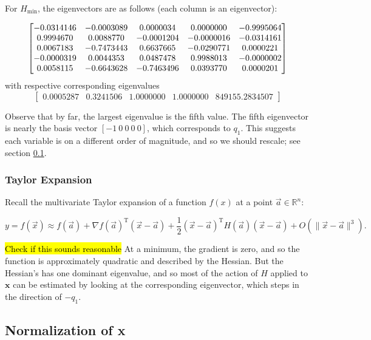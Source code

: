\documentclass[sn-mathphys,Numbered]{sn-jnl}%
\theoremstyle{thmstyleone}%
\theoremstyle{thmstyletwo}%
\theoremstyle{thmstylethree}%
\begin{document}
For $H_{\min}$, the eigenvectors are as follows (each column is an eigenvector):

\[
  \begin{bmatrix}
	-0.0314146 & -0.0003089 &  0.0000034 &  0.0000000 & -0.9995064 \cr
	0.9994670 &  0.0088770 & -0.0001204 & -0.0000016 & -0.0314161 \cr
	0.0067183 & -0.7473443 &  0.6637665 & -0.0290771 &  0.0000221 \cr
	-0.0000319 &  0.0044353 &  0.0487478 &  0.9988013 & -0.0000002 \cr
	0.0058115 & -0.6643628 & -0.7463496 &  0.0393770 &  0.0000201
\end{bmatrix}
\]
with respective corresponding eigenvalues 
\[
  \begin{bmatrix}
	0.0005287 &  0.3241506 &  1.0000000 &  1.0000000 & 849155.2834507
\end{bmatrix}
\]

Observe that by far, the largest eigenvalue is the fifth value.  The fifth eigenvector is nearly the basis vector $[-1 ~0~ 0~ 0~ 0]$, which corresponds to $q_1$.  This suggests each variable is on a different order of magnitude, and so we should rescale; see section \ref{subsec:normalization}.

\subsubsection{Taylor Expansion}


Recall the multivariate Taylor expansion of a function $f(x)$ at a point $\vec{a}\in\mathbb{R}^n$:
%

$$ y = f(\vec{x})\approx f(\vec{a}) + \nabla f(\vec{a})^\mathrm{T} (\vec{x}-\vec{a}) + \frac{1}{2}(\vec{x}-\vec{a})^\mathrm{T} H(\vec{a}) (\vec{x}-\vec{a}) + O( \|\vec{x}-\vec{a}\|^3). $$

\hl{Check if this sounds reasonable} At a minimum, the gradient is zero, and so the function is approximately quadratic and described by the Hessian.  But the Hessian's has one dominant eigenvalue, and so most of the action of $H$ applied to $\textbf{x}$ can be estimated by looking at the corresponding eigenvector, which steps in the direction of $-q_1$.

\subsection{Normalization of \textbf{x}} \label{subsec:normalization}
\end{document}
